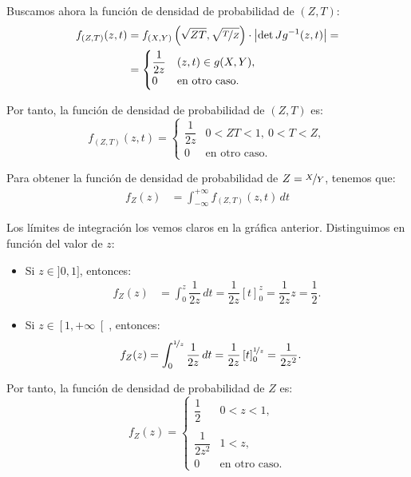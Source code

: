 \begin{ejercicio}
\begin{enumerate}
        Buscamos ahora la función de densidad de probabilidad de $(Z,T)$:
        \begin{align*}
            f_{(Z,T)}(z, t)&=f_{(X,Y)}\left(\sqrt{ZT},\sqrt{\nicefrac{T}{Z}}\right)\cdot \left|\det Jg^{-1}(z,t)\right|
            =\\&= \begin{cases}
                \dfrac{1}{2z} & (z,t)\in g(X,Y), \\
                0 & \text{en otro caso}.
            \end{cases}
        \end{align*}

        Por tanto, la función de densidad de probabilidad de $(Z,T)$ es:
        \begin{equation*}
            f_{(Z,T)}(z, t) = \begin{cases}
                \dfrac{1}{2z} & 0<ZT<1,~0<T<Z, \\
                0 & \text{en otro caso}.
            \end{cases}
        \end{equation*}

        Para obtener la función de densidad de probabilidad de $Z=\nicefrac{X}{Y}$, tenemos que:
        \begin{align*}
            f_{Z}(z)&=\int_{-\infty}^{+\infty} f_{(Z,T)}(z, t) \, dt
        \end{align*}

        Los límites de integración los vemos claros en la gráfica anterior. Distinguimos en función del valor de $z$:
        \begin{itemize}
            \item Si $z\in ]0,1]$, entonces:
            \begin{align*}
                f_Z(z)&=\int_{0}^{z} \dfrac{1}{2z} \, dt = \dfrac{1}{2z}\left[t\right]_{0}^{z} = \dfrac{1}{2z}z = \dfrac{1}{2}.
            \end{align*}

            \item Si $z\in \left[1,+\infty\right[$, entonces:
            \begin{align*}
                f_Z(z)&=\int_{0}^{\nicefrac{1}{z}} \dfrac{1}{2z} \, dt = \dfrac{1}{2z}\left[t\right]_{0}^{\nicefrac{1}{z}} = \dfrac{1}{2z^2}.
            \end{align*}
        \end{itemize}

        Por tanto, la función de densidad de probabilidad de $Z$ es:
        \begin{equation*}
            f_Z(z) = \begin{cases}
                \dfrac{1}{2} & 0<z<1, \\ \\
                \dfrac{1}{2z^2} & 1<z, \\
                0 & \text{en otro caso}.
            \end{cases}
        \end{equation*}


\end{enumerate}
\end{ejercicio}

